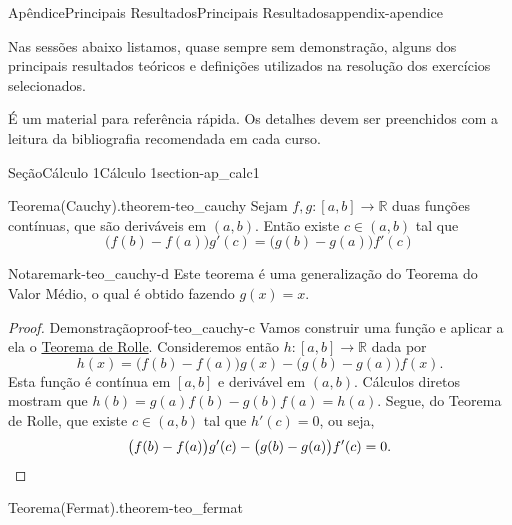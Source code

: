 \documentclass[oneside,10pt,]{book}
\numberwithin{equation}{section}
\newcommand{\qedhere}{\relax}
\newcommand{\R}{\mathbb R}
\begin{document}
\begin{appendixptx}{Apêndice}{Principais Resultados}{}{Principais Resultados}{}{}{appendix-apendice}
\renewcommand*{\appendixname}{Apêndice}
\begin{introduction}{}%
Nas sessões abaixo listamos, quase sempre sem demonstração, alguns dos principais resultados teóricos e definições utilizados na resolução dos exercícios selecionados.%
\par
É um material para referência rápida. Os detalhes devem ser preenchidos com a leitura da bibliografia recomendada em cada curso.%
\end{introduction}%
%
%
\typeout{************************************************}
\typeout{************************************************}
%
\begin{sectionptx}{Seção}{Cálculo 1}{}{Cálculo 1}{}{}{section-ap_calc1}
\begin{theorem}{Teorema}{(Cauchy).}{}{theorem-teo_cauchy}%
Sejam \(f,g\colon [a,b]\to\R\) duas funções contínuas, que são deriváveis em \((a,b)\). Então existe \(c\in (a,b)\) tal que%
\begin{equation*}
\big(f(b)-f(a)\big)g'(c)=\big(g(b)-g(a)\big)f'(c)
\end{equation*}
%
\begin{remark}{Nota}{}{remark-teo_cauchy-d}%
Este teorema é uma generalização do Teorema do Valor Médio, o qual é obtido fazendo \(g(x)=x\).\end{remark}
\end{theorem}
\begin{proof}{Demonstração}{}{proof-teo_cauchy-c}
Vamos construir uma função e aplicar a ela o \href{https://pt.wikipedia.org/wiki/Teorema_de_Rolle}{Teorema de Rolle}\footnotemark{}. Consideremos então \(h\colon [a,b]\to\R\) dada por%
\begin{equation*}
h(x)=\big(f(b)-f(a)\big)g(x)-\big(g(b)-g(a)\big)f(x).
\end{equation*}
Esta função é contínua em \([a,b]\) e derivável em \((a,b)\). Cálculos diretos mostram que \(h(b)=g(a)f(b)-g(b)f(a)=h(a)\). Segue, do Teorema de Rolle, que existe \(c\in (a,b)\) tal que \(h'(c)=0\), ou seja,%
\begin{equation*}
\big(f(b)-f(a)\big)g'(c)-\big(g(b)-g(a)\big)f'(c)=0.\qedhere
\end{equation*}
%
\end{proof}
%
\begin{theorem}{Teorema}{(Fermat).}{}{theorem-teo_fermat}%

\end{theorem}
\end{sectionptx}
\end{appendixptx}
\end{document}
